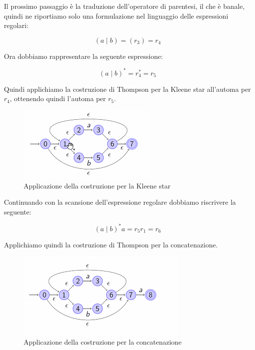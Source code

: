 \documentclass[class=book, crop=false, oneside, 12pt]{standalone}
\begin{document}
Il prossimo passaggio è la traduzione dell'operatore di parentesi, il che è banale, quindi ne riportiamo solo una formulazione nel linguaggio delle espressioni regolari:

\begin{equation*}
    (a \mid b)=(r_3)=r_4
\end{equation*}

\noindent Ora dobbiamo rappresentare la seguente espressione:

\begin{equation*}
    (a\mid b)^\ast = r_4^\ast = r_5
\end{equation*}

\noindent Quindi applichiamo la costruzione di Thompson per la Kleene star all’automa per \(r_4\), ottenendo quindi l’automa per \(r_5\).

\begin{figure}
    \centering
    \includegraphics[width=.5\textwidth,keepaspectratio]{esempio_Thompson_2}
    \caption{Applicazione della costruzione per la Kleene star}
    \label{esempio_Thompson_2}
\end{figure}

\noindent Continuando con la scansione dell’espressione regolare dobbiamo riscrivere la seguente:

\begin{equation}
    (a \mid b)^\ast a = r_5 r_1 = r_6
\end{equation}

\noindent Applichiamo quindi la costruzione di Thompson per la concatenazione.

\begin{figure}
    \centering
    \includegraphics[width=.5\textwidth,keepaspectratio]{esempio_Thompson_3}
    \caption{Applicazione della costruzione per la concatenazione}
    \label{esempio_Thompson_3}
\end{figure}
\end{document}
